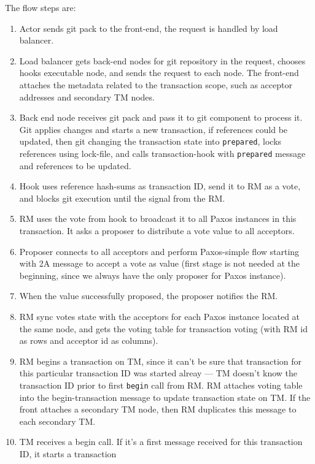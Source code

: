 \documentclass[acmlarge, screen, nonacm, 11pt]{acmart}
\newcommand{\code}[1]{\texttt{#1}}
\begin{document}
The flow steps are:
\begin{enumerate}
    \item Actor sends git pack to the front-end, the request is handled by load balancer.
    \item Load balancer gets back-end nodes for git repository in the request, chooses
      hooks executable node, and sends the request to each node. The front-end attaches the metadata
      related to the transaction scope, such as acceptor addresses and secondary TM nodes.
    \item Back end node receives git pack and pass it to git component to process it.
      Git applies changes and starts a new transaction, if references could be updated,
      then git changing the transaction state into \code{prepared}, locks references using lock-file,
      and calls transaction-hook with \code{prepared} message and references to be updated.
    \item Hook uses reference hash-sums as transaction ID, send it to RM as a vote, and blocks
      git execution until the signal from the RM.
    \item RM uses the vote from hook to broadcast it to all Paxos instances in this transaction.
      It asks a proposer to distribute a vote value to all acceptors.
    \item Proposer connects to all acceptors and perform Paxos-simple flow starting with 2A message
      to accept a vote as value (first stage is not needed at the beginning, since we always have
      the only proposer for Paxos instance).
    \item When the value successfully proposed, the proposer notifies the RM.
    \item RM sync votes state with the acceptors for each Paxos instance located at the same node,
      and gets the voting table for transaction voting (with RM id as rows and acceptor id as columns).
    \item RM begins a transaction on TM, since it can't be sure that transaction for this particular
      transaction ID was started alreay --- TM doesn't know the transaction ID prior to first \code{begin}
      call from RM. RM attaches voting table into the begin-transaction message to update transaction state
      on TM. If the front attaches a secondary TM node, then RM duplicates this message to each secondary TM.
    \item TM receives a begin call. If it's a first message received for this transaction ID, it starts a transaction

\end{enumerate}
\end{document}

